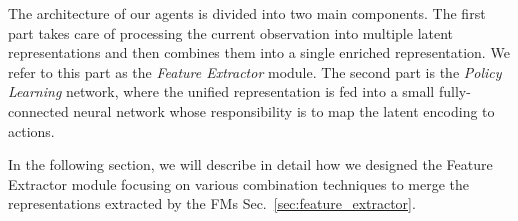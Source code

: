 The architecture of our agents is divided into two main components.
The first part takes care of processing the current observation into multiple latent representations and then combines them into a single enriched representation.
We refer to this part as the \textit{Feature Extractor} module.
The second part is the \textit{Policy Learning} network, where the unified representation is fed into a small fully-connected neural network whose responsibility is to map the latent encoding to actions.


In the following section, we will describe in detail how we designed the Feature Extractor module focusing on various combination techniques to merge the representations extracted by the FMs Sec.~\ref{sec:feature_extractor}.











